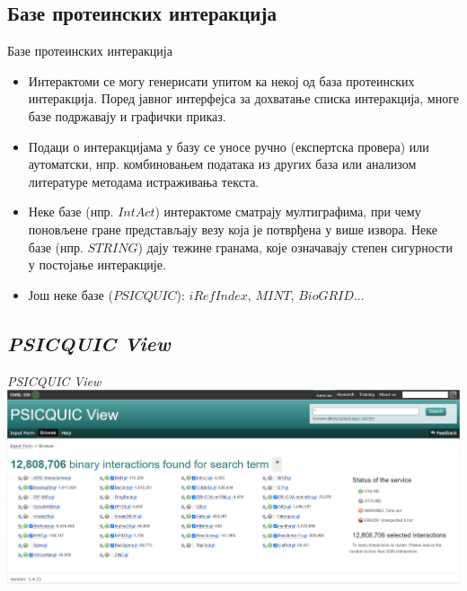 \documentclass[hyperref={bookmarks=false}]{beamer}
\begin{document}
\subsection{Базе протеинских интеракција}
\begin{frame}{Базе протеинских интеракција}
\begin{itemize}
	\item Интерактоми се могу генерисати упитом ка некој од база протеинских интеракција. Поред јавног интерфејса за дохватање списка интеракција, многе базе подржавају и графички приказ.

	\item Подаци о интеракцијама у базу се уносе ручно (експертска провера) или аутоматски, нпр. комбиновањем података из других база или анализом литературе методама истраживања текста.

	\item Неке базе (нпр. $IntAct$) интерактоме сматрају мултиграфима, при чему поновљене гране представљају везу која је потврђена у више извора. Неке базе (нпр. $STRING$) дају тежине гранама, које означавају степен сигурности у постојање интеракције.

	\item Још неке базе ($PSICQUIC$): $iRefIndex$, $MINT$, $BioGRID$...
\end{itemize}
\end{frame}

\subsection{\textit{PSICQUIC View}}
\begin{frame}{\textit{PSICQUIC View}}
\centering\includegraphics[width=\textwidth]{PSICQUIC.png}
\end{frame}
\end{document}
